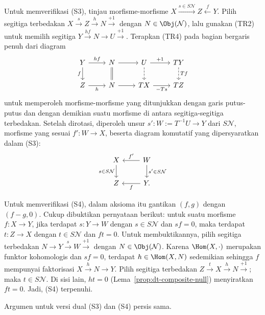 \begin{bukti}
	Untuk memverifikasi (S3), tinjau morfisme-morfisme
	$X \xrightarrow{s \in S\mathcal{N}} Z \xleftarrow{f} Y$. Pilih segitiga
	terbedakan $X \xrightarrow{s} Z \xrightarrow{h} N \xrightarrow{+1}$ dengan
	$N \in \Obj(\mathcal{N})$, lalu gunakan (TR2) untuk memilih segitiga
	$Y \xrightarrow{hf} N \to U \xrightarrow{+1}$. Terapkan (TR4) pada bagian
	bergaris penuh dari diagram
	\[\begin{tikzcd}
		Y \arrow[r, "hf"] \arrow[d, "f"'] & N \arrow[r] \arrow[equal, d] & U \arrow[r, "+1"] \arrow[dashed, d] & TY \arrow[dashed, d, "Tf"] \\
		Z \arrow[r, "h"'] & N \arrow[r] & TX \arrow[r, "-Ts"'] & TZ
	\end{tikzcd}\]
	untuk memperoleh morfisme-morfisme yang ditunjukkan dengan garis putus-putus
	dan dengan demikian suatu morfisme di antara segitiga-segitiga terbedakan.
	Setelah dirotasi, diperoleh unsur $s': W := T^{-1} U \to Y$ dari
	$S\mathcal{N}$, morfisme yang sesuai $f': W \to X$, beserta diagram komutatif
	yang dipersyaratkan dalam (S3):
	\[\begin{tikzcd}
		X \arrow[d, "{s \in S\mathcal{N}}"'] & W \arrow[d, "{s' \in S\mathcal{N}}"] \arrow[l, "{f'}"'] \\
		Z & Y \arrow[l, "f"] .
	\end{tikzcd}\]

	Untuk memverifikasi (S4), dalam aksioma itu gantikan $(f, g)$ dengan
	$(f-g, 0)$. Cukup dibuktikan pernyataan berikut: untuk suatu
	morfisme $f: X \to Y$, jika terdapat $s: Y \to W$ dengan
	$s \in S\mathcal{N}$ dan $sf = 0$, maka terdapat $t: Z \to X$ dengan
	$t \in S\mathcal{N}$ dan $ft = 0$. Untuk membuktikannya, pilih segitiga
	terbedakan $N \to Y \xrightarrow{s} W \xrightarrow{+1}$ dengan
	$N \in \Obj(\mathcal{N})$. Karena $\Hom(X, \cdot)$ merupakan funktor
	kohomologis dan $sf=0$, terdapat $h \in \Hom(X, N)$ sedemikian sehingga
	$f$ mempunyai faktorisasi $X \xrightarrow{h} N \to Y$. Pilih segitiga
	terbedakan $Z \xrightarrow{t} X \xrightarrow{h} N \xrightarrow{+1}$;
	maka $t \in S\mathcal{N}$. Di sisi lain, $ht=0$
	(Lema~\ref{prop:dt-composite-null}) menyiratkan $ft = 0$. Jadi, (S4)
	terpenuhi.

	Argumen untuk versi dual (S3) dan (S4) persis sama.
\end{bukti}

